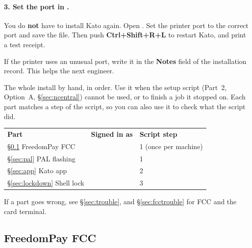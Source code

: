 \documentclass[a4paper,10pt]{article}
\begin{document}
\paragraph{3. Set the port in .} You do
\textbf{not} have to install Kato again. Open
. Set the printer port to the correct port and
save the file. Then push \textbf{Ctrl+Shift+R+L} to restart Kato, and print a test
receipt.

\begin{wkinfo}
If the printer uses an unusual port, write it in the \textbf{Notes} field
of the installation record. This helps the next engineer.
\end{wkinfo}

\clearpage

\appendix
\label{sec:manualapp}

The whole install by hand, in order. Use it when the setup script (Part~2,
Option~A, \S\ref{sec:ncentral}) cannot be used, or to finish a job it
stopped on. Each part matches a step of the script, so you can also use it
to check what the script did.

\begin{center}
\renewcommand{\arraystretch}{1.35}\small
\begin{tabularx}{\textwidth}{L{50mm} L{30mm} X}
\color{white}\textbf{Part} &
\color{white}\textbf{Signed in as} &
\color{white}\textbf{Script step}\\
\S\ref{sec:fcc} FreedomPay FCC &  & 1 (once per machine)\\
\S\ref{sec:pal} PAL flashing &  & 1\\
\S\ref{sec:app} Kato app &  & 2\\
\S\ref{sec:lockdown} Shell lock &  & 3\\
\end{tabularx}
\end{center}

\noindent If a part goes wrong, see \S\ref{sec:trouble}, and \S\ref{sec:fcctrouble}
for FCC and the card terminal.

\subsection{FreedomPay FCC}\label{sec:fcc}
\end{document}
